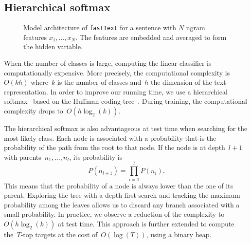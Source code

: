 \documentclass[11pt,letterpaper]{article}
\begin{document}
\subsection{Hierarchical softmax}

\begin{figure}
\centering
{}
\caption{Model architecture of \texttt{fastText} for a sentence with $N$ ngram features $x_1,\dots,x_N$. The features
are embedded and averaged to form the hidden variable.}
\label{fig:model}
\end{figure}

When the number of classes is large, computing the linear classifier
is computationally expensive. More precisely, the computational complexity
is~$O(kh)$ where~$k$ is the number of classes and~$h$ the dimension of the text
representation.
In order to improve our running time, we use a hierarchical
softmax~\cite{goodman2001classes} based on the Huffman coding tree~\cite{mikolov2013efficient}.
During training, the computational complexity drops to~$O(h\log_2(k))$. 

The hierarchical softmax is also advantageous at test time when searching for
the most likely class. Each node is associated with a probability that is the
probability of the path from the root to that node.
If the node is at depth~$l+1$ with parents~$n_1,\dots,n_{l}$, its probability is
$$P(n_{l+1}) = \prod_{i=1}^l P(n_i). $$
This means that the probability of a node is always lower than the one of its parent.
Exploring the tree with a depth first search and tracking
the maximum probability among the leaves allows us to discard any branch
associated with a small probability. In practice, we observe a reduction of the
complexity to~$O(h\log_2(k))$ at test time. This approach is further
extended to compute the~$T$-top targets at the cost of~$O(\log(T))$, using a binary heap.
\end{document}
